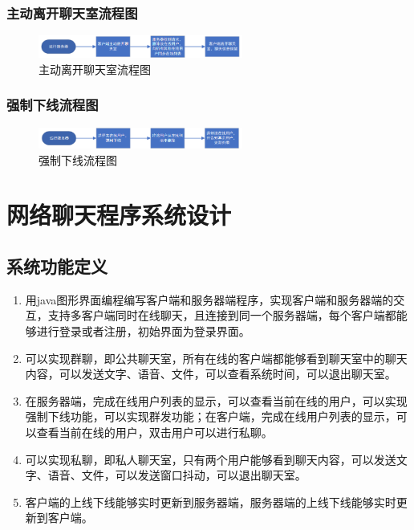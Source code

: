 \documentclass[UTF8,12pt]{article}
\begin{document}
\subsubsection{主动离开聊天室流程图}
\begin{figure}[htbp]
    \centering
    \includegraphics[width=0.6\textwidth]{img/4.png}
    \caption{主动离开聊天室流程图}
\end{figure}

\subsubsection{强制下线流程图}
\begin{figure}[htbp]
    \centering
    \includegraphics[width=0.6\textwidth]{img/5.png}
    \caption{强制下线流程图}
\end{figure}

\newpage

\section{网络聊天程序系统设计}
\subsection{系统功能定义}
\begin{enumerate}
    \item 用java图形界面编程编写客户端和服务器端程序，实现客户端和服务器端的交互，支持多客户端同时在线聊天，且连接到同一个服务器端，每个客户端都能够进行登录或者注册，初始界面为登录界面。
    \item 可以实现群聊，即公共聊天室，所有在线的客户端都能够看到聊天室中的聊天内容，可以发送文字、语音、文件，可以查看系统时间，可以退出聊天室。
    \item 在服务器端，完成在线用户列表的显示，可以查看当前在线的用户，可以实现强制下线功能，可以实现群发功能；在客户端，完成在线用户列表的显示，可以查看当前在线的用户，双击用户可以进行私聊。
    \item 可以实现私聊，即私人聊天室，只有两个用户能够看到聊天内容，可以发送文字、语音、文件，可以发送窗口抖动，可以退出聊天室。
    \item 客户端的上线下线能够实时更新到服务器端，服务器端的上线下线能够实时更新到客户端。
\end{enumerate}
\end{document}
